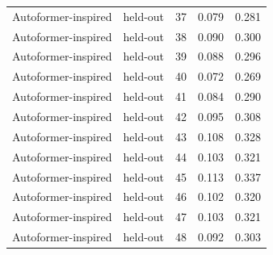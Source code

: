 \begin{tabular}{llrrr}
Autoformer-inspired & held-out & 37 & 0.079 & 0.281 \\
Autoformer-inspired & held-out & 38 & 0.090 & 0.300 \\
Autoformer-inspired & held-out & 39 & 0.088 & 0.296 \\
Autoformer-inspired & held-out & 40 & 0.072 & 0.269 \\
Autoformer-inspired & held-out & 41 & 0.084 & 0.290 \\
Autoformer-inspired & held-out & 42 & 0.095 & 0.308 \\
Autoformer-inspired & held-out & 43 & 0.108 & 0.328 \\
Autoformer-inspired & held-out & 44 & 0.103 & 0.321 \\
Autoformer-inspired & held-out & 45 & 0.113 & 0.337 \\
Autoformer-inspired & held-out & 46 & 0.102 & 0.320 \\
Autoformer-inspired & held-out & 47 & 0.103 & 0.321 \\
Autoformer-inspired & held-out & 48 & 0.092 & 0.303 \\
\bottomrule
\end{tabular}
